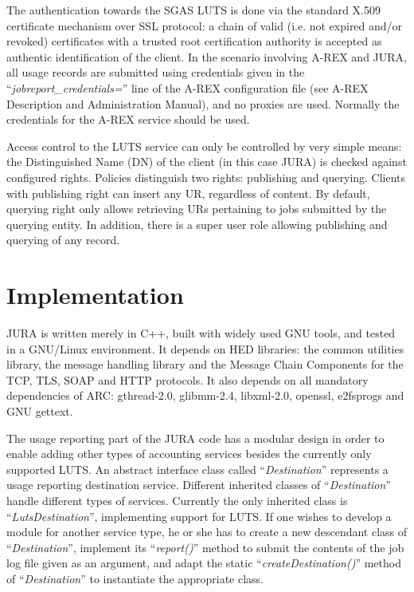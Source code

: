 \documentclass{article}                            %
\begin{document}
The authentication towards the SGAS LUTS is done via the standard
X.509 certificate mechanism over SSL protocol: a chain of valid
(i.e. not expired and/or revoked) certificates with a trusted root
certification authority is accepted as authentic identification of the
client. In the scenario involving A-REX and JURA,
all usage records are submitted using credentials given in the
``\textit{jobreport\_credentials=}'' line of the A-REX configuration file
(see A-REX Description and Administration Manual\cite{arex}), and no
proxies are used. Normally the credentials for the A-REX service
should be used.

Access control to the LUTS service can only be controlled by very
simple means: the Distinguished Name (DN) of the client (in this case
JURA) is checked against configured rights. Policies distinguish two
rights: publishing and querying. Clients with publishing right can
insert any UR, regardless of content. By default, querying right only
allows retrieving URs pertaining to jobs submitted by the querying
entity. In addition, there is a super user role allowing publishing
and querying of any record.





\section{Implementation}
\label{implement}
JURA is written merely in C++, built with widely used GNU tools, and
tested in a GNU/Linux environment. It depends on HED libraries: the
common utilities library, the message handling library and the Message
Chain Components for the TCP, TLS, SOAP and HTTP protocols. It also
depends on all mandatory dependencies of ARC: gthread-2.0, glibmm-2.4,
libxml-2.0, openssl, e2fsprogs and GNU gettext.


The usage reporting part of the JURA code has a modular design in
order to enable adding other types of accounting services besides the
currently only supported LUTS. An abstract interface class called
``\textit{Destination}'' represents a usage reporting destination
service. Different inherited classes of ``\textit{Destination}''
handle different types of services. Currently the only inherited class
is ``\textit{LutsDestination}'', implementing support for LUTS. If one
wishes to develop a module for another service type, he or she has to
create a new descendant class of ``\textit{Destination}'', implement
its ``\textit{report()}'' method to submit the contents of the job log
file given as an argument, and adapt the static
``\textit{createDestination()}'' method of ``\textit{Destination}'' to
instantiate the appropriate class.
\end{document}
